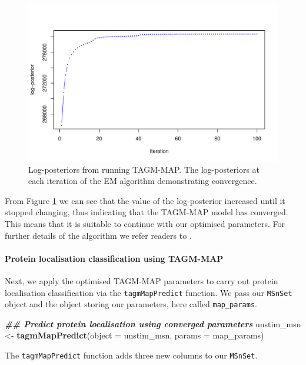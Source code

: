 \documentclass[9pt,a4paper,]{extarticle}
\newenvironment{Shaded}{\begin{snugshade}}{\end{snugshade}}
\newcommand{\AttributeTok}[1]{\textcolor[rgb]{0.13,0.29,0.53}{#1}}
\newcommand{\DocumentationTok}[1]{\textcolor[rgb]{0.56,0.35,0.01}{\textbf{\textit{#1}}}}
\newcommand{\FunctionTok}[1]{\textcolor[rgb]{0.13,0.29,0.53}{\textbf{#1}}}
\newcommand{\NormalTok}[1]{#1}
\newcommand{\OtherTok}[1]{\textcolor[rgb]{0.56,0.35,0.01}{#1}}
\begin{document}
\begin{figure}[H]

{\centering \includegraphics[width=0.7\linewidth,]{figs/log_post} 

}

\caption{Log-posteriors from running TAGM-MAP. The log-posteriors at each iteration of the EM algorithm demonstrating convergence.}\label{fig:fig-posterior}
\end{figure}

From Figure \ref{fig:fig-posterior} we can see that the value of the log-posterior increased until it
stopped changing, thus indicating that the TAGM-MAP model has converged. This
means that it is suitable to continue with our optimised parameters. For further
details of the algorithm we refer readers to \citet{Crook2019}.

\paragraph{Protein localisation classification using TAGM-MAP}\label{protein-localisation-classification-using-tagm-map}

Next, we apply the optimised TAGM-MAP parameters to carry out protein localisation
classification via the \texttt{tagmMapPredict} function. We pass our \texttt{MSnSet} object and
the object storing our parameters, here called \texttt{map\_params}.

\begin{Shaded}
\begin{Highlighting}[]
\DocumentationTok{\#\# Predict protein localisation using converged parameters}
\NormalTok{unstim\_msn }\OtherTok{\textless{}{-}} \FunctionTok{tagmMapPredict}\NormalTok{(}\AttributeTok{object =}\NormalTok{ unstim\_msn, }\AttributeTok{params =}\NormalTok{ map\_params)}
\end{Highlighting}
\end{Shaded}

The \texttt{tagmMapPredict} function adds three new columns to our \texttt{MSnSet}.
\end{document}
